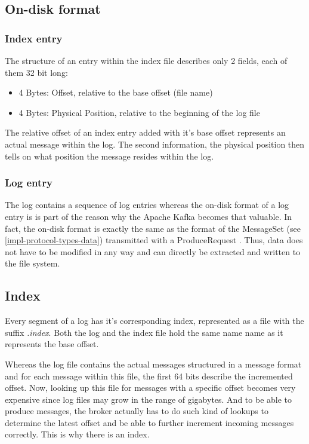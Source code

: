 \subsection{On-disk format}

\subsubsection{Index entry}

The structure of an entry within the index file describes only 2 fields, each of
them 32 bit long:

\begin{itemize}
    \item 4 Bytes: Offset, relative to the base offset (file name)
    \item 4 Bytes: Physical Position, relative to the beginning of the log file
\end{itemize}

The relative offset of an index entry added with it's base offset represents an
actual message within the log. The second information, the physical position
then tells on what position the message resides within the log.

\subsubsection{Log entry}

The log contains a sequence of log entries whereas the on-disk format of a log
entry is is part of the reason why the Apache Kafka becomes that valuable. In
fact, the on-disk format is exactly the same as the format of the MessageSet
(see \ref{impl-protocol-types-data}) transmitted with a ProduceRequest
. Thus, data does not have to be
modified in any way and can directly be extracted and written to the file
system.


\subsection{Index}

Every segment of a log has it's corresponding index, represented as a file with
the suffix \textit{.index}. Both the log and the index file hold the same name
name as it represents the base offset.

Whereas the log file contains the actual messages structured in a
message format and for each message within this file, the first 64 bits describe
the incremented offset. Now, looking up this file for messages with a specific
offset becomes very expensive since log files may grow in the range of gigabytes.
And to be able to produce messages, the broker actually has to do such kind of
lookups to determine the latest offset and be able to further increment
incoming messages correctly. This is why there is an index.

